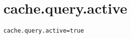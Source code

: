 \section{cache.query.active}
\label{configuration:CacheQueryActive}
\ClearAPI
\TODO
{}
\begin{lstlisting}[style=Props,caption={Usage example for \textit{cache.query.active}}]
cache.query.active=true
\end{lstlisting}